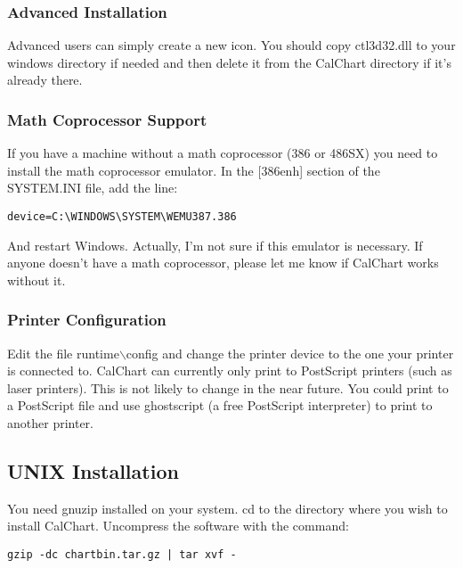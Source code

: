 \subsubsection{Advanced Installation}\label{advinstall}

Advanced users can simply create a new icon.  You should copy
ctl3d32.dll to your windows directory if needed and then delete it
from the CalChart directory if it's already there.

\subsubsection{Math Coprocessor Support}\label{mathcop}

If you have a machine without a math coprocessor (386 or 486SX) you need
to install the math coprocessor emulator.  In the [386enh] section of
the SYSTEM.INI file, add the line:

\begin{verbatim}
device=C:\WINDOWS\SYSTEM\WEMU387.386
\end{verbatim}

And restart Windows.  Actually, I'm not sure if this emulator is necessary.
If anyone doesn't have a math coprocessor, please let me know if
CalChart works without it.

\subsubsection{Printer Configuration}\label{winprinter}

Edit the file runtime$\backslash$config and change the printer device to the
one your printer is connected to.  CalChart can currently only print to
PostScript printers (such as laser printers).  This is not likely to
change in the near future.  You could print to a PostScript file and use
ghostscript (a free PostScript interpreter) to print to another
printer.

\subsection{UNIX Installation}\label{unixinstall}

You need gnuzip installed on your system.  cd to the directory where you
wish to install CalChart.  Uncompress the software with the command:

\begin{verbatim}
gzip -dc chartbin.tar.gz | tar xvf -
\end{verbatim}

